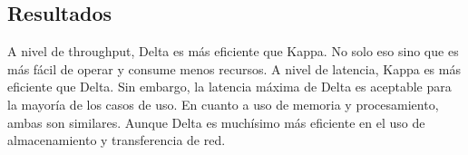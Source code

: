 \newpage

\subsection{Resultados}

A nivel de throughput, Delta es más eficiente que Kappa. No solo eso sino que es más fácil de operar y consume menos recursos.
A nivel de latencia, Kappa es más eficiente que Delta. Sin embargo, la latencia máxima de Delta es aceptable para la mayoría de los casos de uso.
En cuanto a uso de memoria y procesamiento, ambas son similares. Aunque Delta es muchísimo más eficiente en el uso de almacenamiento y transferencia de red. 

\newpage
